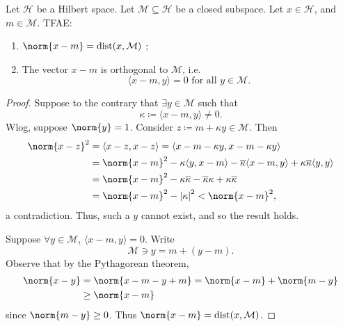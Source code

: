 \documentclass[notoc,notitlepage]{tufte-book}
\DeclareMathOperator{\dist}{dist}
\begin{document}
\begin{thm}\label{thm:a_way_to_orthogonality}
  Let $\mathcal{H}$ be a Hilbert space.
  Let $\mathcal{M} \subseteq \mathcal{H}$ be a closed subspace.
  Let $x \in \mathcal{H}$, and $m \in \mathcal{M}$. TFAE:
  \begin{enumerate}
    \item $\norm{x - m} = \dist(x, \mathcal{M})$ ;
    \item The vector $x - m$ is orthogonal to $\mathcal{M}$, i.e.
      \begin{equation*}
        \langle x - m, y \rangle = 0 \text{ for all } y \in \mathcal{M}.
      \end{equation*}
  \end{enumerate}
\end{thm}

\begin{proof}
  Suppose to the contrary that $\exists y \in \mathcal{M}$
  such that
  \begin{equation*}
    \kappa \coloneqq \langle x - m, y \rangle \neq 0.
  \end{equation*}
  Wlog, suppose $\norm{y} = 1$.
  Consider $z \coloneqq m + \kappa y \in \mathcal{M}$.
  Then
  \begin{align*}
    \norm{x - z}^2
    &= \langle x - z, x - z \rangle
    = \langle x - m - \kappa y, x - m - \kappa y \rangle \\
    &= \norm{x - m}^2 - \kappa \langle y, x - m \rangle
      - \overline{\kappa} \langle x - m, y \rangle
      + \kappa \overline{\kappa} \langle y, y \rangle \\
    &= \norm{x - m}^2 - \kappa \overline{\kappa}
      - \overline{\kappa} \kappa + \kappa \overline{\kappa} \\
    &= \norm{x - m}^2 - \abs{\kappa}^2 < \norm{x - m}^2,
  \end{align*}
  a contradiction.
  Thus, such a $y$ cannot exist, and so the result holds.

  \noindent
   Suppose $\forall y \in \mathcal{M}$,
  $\langle x - m, y \rangle = 0$.
  Write
  \begin{equation*}
    \mathcal{M} \ni y = m + (y - m).
  \end{equation*}
  Observe that by the Pythagorean theorem,
  \begin{align*}
    \norm{x - y} &= \norm{x - m - y + m} = \norm{x - m} + \norm{m - y} \\
                 &\geq \norm{x - m}
  \end{align*}
  since $\norm{m - y} \geq 0$.
  Thus $\norm{x - m} = \dist(x, \mathcal{M})$.
\end{proof}
\end{document}
